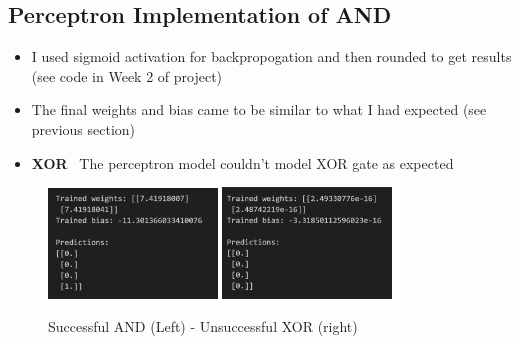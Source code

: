 \documentclass[12pt,a4paper]{article}
\begin{document}
\subsection{Perceptron Implementation of AND}
\begin{itemize}

\item I used sigmoid activation for backpropogation and then rounded to get results 
\subitem (see code in Week 2 of project)
\item The final weights and bias came to be similar to what I had expected
\subitem (see previous section)
\item \textbf{XOR} \ The perceptron model couldn't model XOR gate as expected
\end{itemize}
\begin{figure}[h!]
    \centering
    \includegraphics[width=0.4\textwidth]{AND} 
\includegraphics[width=0.4\textwidth]{XOR_fail} 
    \caption{Successful AND (Left) - Unsuccessful XOR (right)}
    \label{fig:example}
\end{figure}
\end{document}
